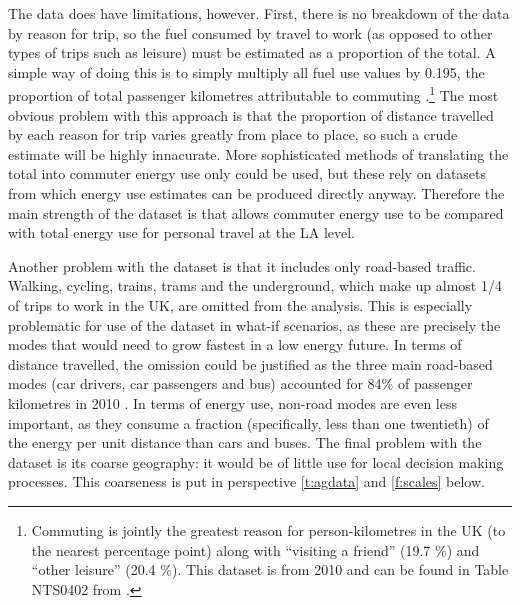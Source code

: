 The data does have limitations, however. First, there is no breakdown of the
data by reason for trip, so the fuel consumed by travel to work (as opposed to
other types of trips such as leisure) must be estimated as a proportion of the
total. A simple way of doing this is to simply multiply all fuel use values
by 0.195, the proportion of total passenger kilometres attributable to
commuting \citep{NationalTravelStatistics2012}.\footnote{Commuting is jointly
the greatest reason for person-kilometres in the UK (to the nearest percentage
point) along with ``visiting a friend'' (19.7 \%) and ``other leisure'' (20.4
\%). This dataset is from 2010 and can be found in Table NTS0402 from
\citet{NationalTravelStatistics2012}.
}
The most obvious problem with this approach is that the proportion of
distance travelled by each reason for trip varies greatly from place to
place, %
so such a crude estimate will be highly innacurate. More sophisticated
methods of translating the total into commuter energy use only could be used,
but these rely on datasets from which energy use estimates can be produced
directly anyway. Therefore the main strength of the dataset is that allows
commuter energy use to be compared with total energy use for personal travel at
the LA level.%

Another problem with the \citet{Decc2008-tcons} dataset is that it includes only
road-based traffic. Walking, cycling, trains, trams and the underground, which
make up almost 1/4 of trips to work in the UK, are
omitted from the analysis. This is especially problematic for use of the
dataset in what-if scenarios, as these are precisely the modes that would
need to grow fastest in a low energy future. In terms of distance travelled,
the omission could be justified as the three main road-based modes (car
drivers, car
passengers and bus) accounted for 84\% of passenger kilometres in 2010
\citep{NationalTravelStatistics2012}. In terms of energy use, non-road modes
are even less important, as they consume a fraction (specifically, less than
one twentieth) of the energy per unit
distance than cars and buses. The final problem with the dataset is its coarse
geography: it would be of little use for local decision making processes. This
coarseness is put in perspective \cref{t:agdata} and \cref{f:scales} below.
 
